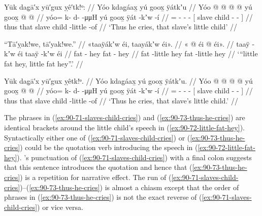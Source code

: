\ex\label{ex:90-71-slaves-child-cries}%
%
\begingl
	\glpreamble	Yūk dag̣ā′x yū′gux ỵê′tk!ᵒ: //
	\glpreamble	Yóo kdag̱áax̱ yú goox̱ ÿátkʼu //
	\gla	Yóo @  @ {} @ {} @ {}
		{} yú goox̱  @ {} @ {} {} //
	\glb	yóo= k- d-  -μμH
		{} yú goox̱ ÿát -kʼw -í {}  //
	\glc	{}= - -  -
		{}[  slave child - - {}] //
	\gld	thus  {} {} {}
		{} that slave child -little -of {} //
	\glft	‘Thus he cries, that slave’s little child’
		//
\endgl
\xe

\ex\label{ex:90-72-little-fat-hey}%
%
\begingl
	\glpreamble	“Tā′ỵak!we, tā′yak!we.” //
	\glpreamble	«\!taaÿákʼw éi, taayákʼw éi\!». //
	\gla	«\! @ {} éi  @ {} éi\!». //
	\glb	\pqp{}taaÿ -kʼw éi taaÿ -kʼw éi //
	\glc	\pqp{}fat - hey fat - hey //
	\gld	\pqp{}fat -little hey fat -little hey //
	\glft	‘“little fat hey, little fat hey”.’
		//
\endgl
\xe

\ex\label{ex:90-73-thus-he-cries}%
%
\begingl
	\glpreamble	Yūk dag̣ā′x yū′gux ỵêtk!ᵒ. //
	\glpreamble	Yóo kdag̱áax̱ yú goox̱ ÿátkʼu. //
	\gla	Yóo @  @ {} @ {} @ {}
		{} yú goox̱  @ {} @ {} {} //
	\glb	yóo= k- d-  -μμH
		{} yú goox̱ ÿát -kʼw -í {}  //
	\glc	{}= - -  -
		{}[  slave child - - {}] //
	\gld	thus  {} {} {}
		{} that slave child -little -of {} //
	\glft	‘Thus he cries, that slave’s little child.’
		//
\endgl
\xe

The phrases in (\ref{ex:90-71-slaves-child-cries}) and (\ref{ex:90-73-thus-he-cries}) are identical brackets around the little child’s speech in (\ref{ex:90-72-little-fat-hey}).
Syntactically either one of (\ref{ex:90-71-slaves-child-cries}) or (\ref{ex:90-73-thus-he-cries}) could be the quotation verb introducing the speech in (\ref{ex:90-72-little-fat-hey}).
\citeauthor{swanton:1909}’s punctuation of (\ref{ex:90-71-slaves-child-cries}) with a final colon \orth{:} suggests that this sentence introduces the quotation and hence that (\ref{ex:90-73-thus-he-cries}) is a repetition for narrative effect.
The run of (\ref{ex:90-71-slaves-child-cries})–(\ref{ex:90-73-thus-he-cries}) is almost a chiasm except that the order of phrases in (\ref{ex:90-73-thus-he-cries}) is not the exact reverse  of (\ref{ex:90-71-slaves-child-cries}) or vice versa.

